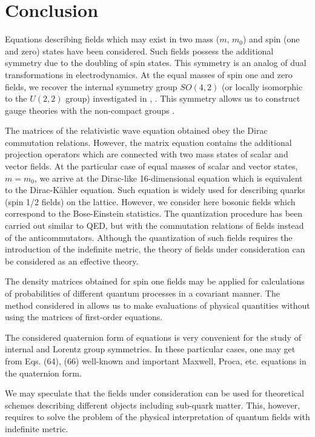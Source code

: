 \documentclass[a4paper,12pt]{article}
\begin{document}
\section{Conclusion}

Equations describing fields which may exist in two mass ($m$,
$m_0$) and spin (one and zero) states have been considered. Such
fields possess the additional symmetry due to the doubling of spin
states. This symmetry is an analog of dual transformations in
electrodynamics. At the equal masses of spin one and zero fields,
we recover the internal symmetry group $SO(4,2)$ (or locally
isomorphic to the $U(2,2)$ group) investigated in \cite{Kruglov1},
\cite{monogr}. This symmetry allows us to construct gauge theories
with the non-compact groups \cite{monogr}.

The matrices of the relativistic wave equation obtained obey the
Dirac commutation relations. However, the matrix equation contains
the additional projection operators which are connected with two
mass states of scalar and vector fields. At the particular case of
equal masses of scalar and vector states, $m=m_0$, we arrive at
the Dirac-like 16-dimensional equation which is equivalent to the
Dirac-K\"{a}hler equation. Such equation is widely used for
describing quarks (spin 1/2 fields) on the lattice. However, we
consider here bosonic fields which correspond to the Bose-Einstein
statistics. The quantization procedure has been carried out
similar to QED, but with the commutation relations of fields
instead of the anticommutators. Although the quantization of such
fields requires the introduction of the indefinite metric, the
theory of fields under consideration can be considered as an
effective theory.

The density matrices obtained for spin one fields may be applied
for calculations of probabilities of different quantum processes
in a covariant manner. The method considered in \cite{Fedorov}
allows us to make evaluations of physical quantities without using
the matrices of first-order equations.

The considered quaternion form of equations is very convenient for
the study of internal and Lorentz group symmetries. In these
particular cases, one may get from Eqs. (64), (66) well-known and
important Maxwell, Proca, etc. equations in the quaternion form.

We may speculate that the fields under consideration can be used
for theoretical schemes describing different objects including
sub-quark matter. This, however, requires to solve the problem of
the physical interpretation of quantum fields with indefinite
metric.
\end{document}
